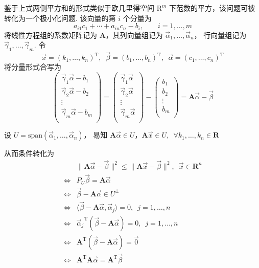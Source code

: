 {    鉴于上式两侧平方和的形式类似于欧几里得空间 $ \mathrm{R}^{m} $ 下范数的平方，该问题可被转化为一个极小化问题. 
    该向量的第 $ i $ 个分量为 
    \[a_{i1}c_1 + \cdots  + a_{in}c_n - b_i, \qquad i = 1, \ldots , m\]
    将线性方程组的系数矩阵记为 $ \mathbf{A} $，其列向量组记为 $ \vec{\alpha} _1 , \ldots , \vec{\alpha} _n $，
    行向量组记为 $ \vec{\gamma} _1 , \ldots , \vec{\gamma} _m $. 令
    \[ \vec{x} = (k_1, \ldots , k_n)^{\mathrm{T}}, \enspace \vec{\beta} = (b_1, \ldots , b_n)^{\mathrm{T}}, \enspace 
    \vec{\alpha} = (c_1, \ldots , c_n)^{\mathrm{T}}\]
    将分量形式合写为
    \[
    \begin{pmatrix}
        \vec{\gamma} _1\vec{\alpha} - b_1 \\
        \vec{\gamma} _2\vec{\alpha} - b_2 \\
        \vdots  \\
        \vec{\gamma} _m\vec{\alpha} - b_m \\
    \end{pmatrix}
     = 
     \begin{pmatrix}
        \vec{\gamma} _1\vec{\alpha} \\
        \vec{\gamma} _2\vec{\alpha} \\
        \vdots  \\
        \vec{\gamma} _m\vec{\alpha} \\
    \end{pmatrix}
    - 
    \begin{pmatrix}
        b_1 \\
        b_2 \\
        \vdots  \\
        b_m \\
    \end{pmatrix}
    = \mathbf{A}\vec{\alpha} - \vec{\beta}
    \]

    设 $ U = \mathrm{span} (\vec{\alpha} _1 , \ldots , \vec{\alpha} _n)$，
    易知 $ \mathbf{A}\vec{\alpha} \in U $，$ \mathbf{A}\vec{x} \in U , \enspace \forall k_1, \ldots , k_n \in \mathbf{R}$

    从而条件转化为
    \begin{align*}
        & \lVert \mathbf{A}\vec{\alpha} - \vec{\beta} \rVert^{2} \leqslant \lVert \mathbf{A}\vec{x} - \vec{\beta} \rVert^{2}, 
        \enspace \vec{x} \in \mathbf{R}^{n} \\
        \Longleftrightarrow & P_U \vec{\beta} = \mathbf{A}\vec{\alpha} \\
        \Longleftrightarrow & \vec{\beta} - \mathbf{A}\vec{\alpha} \in U^{\perp} \\
        \Longleftrightarrow & \langle \vec{\beta} - \mathbf{A}\vec{\alpha}, \vec{\alpha} _j \rangle = 0, \enspace j = 1, \ldots , n \\
        \Longleftrightarrow & {\vec{\alpha} _j}^{\mathrm{T}}(\vec{\beta} - \mathbf{A}\vec{\alpha}) = 0, \enspace j = 1, \ldots , n \\
        \Longleftrightarrow & \mathbf{A}^{\mathrm{T}}(\vec{\beta} - \mathbf{A}\vec{\alpha}) = \vec{0} \\
        \Longleftrightarrow & \mathbf{A}^{\mathrm{T}}\mathbf{A}\vec{\alpha} = \mathbf{A}^{\mathrm{T}}\vec{\beta}
    \end{align*}

}

